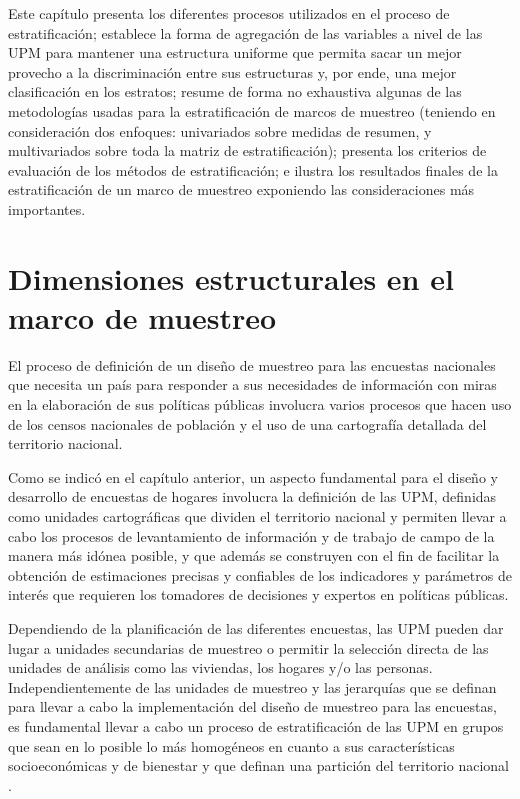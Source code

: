 \documentclass[
  12pt,
  spanish,
]{book}
\begin{document}
Este capítulo presenta los diferentes procesos utilizados en el proceso de estratificación; establece la forma de agregación de las variables a nivel de las UPM para mantener una estructura uniforme que permita sacar un mejor provecho a la discriminación entre sus estructuras y, por ende, una mejor clasificación en los estratos; resume de forma no exhaustiva algunas de las metodologías usadas para la estratificación de marcos de muestreo (teniendo en consideración dos enfoques: univariados sobre medidas de resumen, y multivariados sobre toda la matriz de estratificación); presenta los criterios de evaluación de los métodos de estratificación; e ilustra los resultados finales de la estratificación de un marco de muestreo exponiendo las consideraciones más importantes.

\hypertarget{dimensiones-estructurales-en-el-marco-de-muestreo}{%
\section{Dimensiones estructurales en el marco de muestreo}\label{dimensiones-estructurales-en-el-marco-de-muestreo}}

El proceso de definición de un diseño de muestreo para las encuestas nacionales que necesita un país para responder a sus necesidades de información con miras en la elaboración de sus políticas públicas involucra varios procesos que hacen uso de los censos nacionales de población y el uso de una cartografía detallada del territorio nacional.

Como se indicó en el capítulo anterior, un aspecto fundamental para el diseño y desarrollo de encuestas de hogares involucra la definición de las UPM, definidas como unidades cartográficas que dividen el territorio nacional y permiten llevar a cabo los procesos de levantamiento de información y de trabajo de campo de la manera más idónea posible, y que además se construyen con el fin de facilitar la obtención de estimaciones precisas y confiables de los indicadores y parámetros de interés que requieren los tomadores de decisiones y expertos en políticas públicas.

Dependiendo de la planificación de las diferentes encuestas, las UPM pueden dar lugar a unidades secundarias de muestreo o permitir la selección directa de las unidades de análisis como las viviendas, los hogares y/o las personas. Independientemente de las unidades de muestreo y las jerarquías que se definan para llevar a cabo la implementación del diseño de muestreo para las encuestas, es fundamental llevar a cabo un proceso de estratificación de las UPM en grupos que sean en lo posible lo más homogéneos en cuanto a sus características socioeconómicas y de bienestar y que definan una partición del territorio nacional \citep{Gutierrez_2016}.
\end{document}
